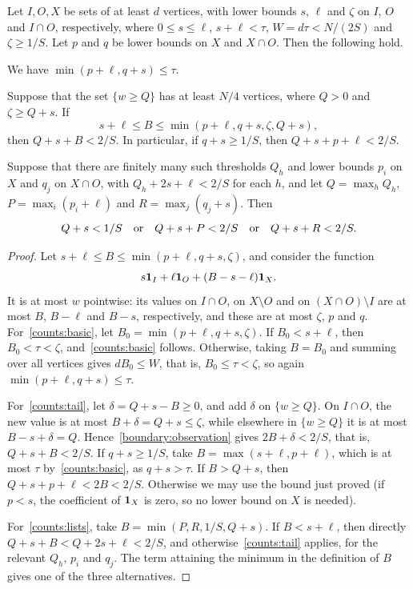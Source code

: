 \begin{lemma}
\label{boundary391:counts}\label{boundary391:counts:1}
\label{shiftroot:three-set}\label{jointtail:count}
\label{middlelift:capped-count}\label{pairedtails:disjunction}
Let $I,O,X$ be sets of at least $d$ vertices, with lower bounds
$s$, $\ell$ and $\zeta$ on $I$, $O$ and $I\cap O$, respectively, where
$0\le s\le\ell$, $s+\ell<\tau$,
$W=d\tau<N/(2S)$ and $\zeta\ge1/S$. Let $p$ and $q$ be lower bounds on $X$ and $X\cap O$. Then the following hold.
\begin{props}
\item\label{counts:basic} We have $\min(p+\ell,q+s)\le\tau$.
\item\label{counts:tail} Suppose that the set $\{w\ge Q\}$ has at least $N/4$ vertices, where $Q>0$ and $\zeta\ge Q+s$. If
\[
 s+\ell\le B\le\min(p+\ell,q+s,\zeta,Q+s),
\]
then $Q+s+B<2/S$. In particular, if $q+s\ge1/S$, then
$Q+s+p+\ell<2/S$.
\item\label{counts:lists} Suppose that there are finitely many such thresholds $Q_h$
and lower bounds $p_i$ on $X$ and $q_j$ on $X\cap O$, with $Q_h+2s+\ell<2/S$ for each $h$, and let
$Q=\max_h Q_h$, $P=\max_i(p_i+\ell)$ and $R=\max_j(q_j+s)$.
Then
\begin{equation}\label{pairedtails:three-branches}
 Q+s<1/S\quad\hbox{or}\quad Q+s+P<2/S
 \quad\hbox{or}\quad Q+s+R<2/S.
\end{equation}
\end{props}
\end{lemma}
\begin{proof}
Let $s+\ell\le B\le\min(p+\ell,q+s,\zeta)$, and consider the function
\[
 s\mathbf 1_I+\ell\mathbf 1_O+(B-s-\ell)\mathbf 1_X.
\]
It is at most $w$ pointwise: its values on
$I\cap O$, on $X\setminus O$ and on
$(X\cap O)\setminus I$ are at most $B$, $B-\ell$ and $B-s$, respectively, and these are at most $\zeta$, $p$ and $q$.
For~\ref{counts:basic}, let $B_0=\min(p+\ell,q+s,\zeta)$. If $B_0<s+\ell$, then
$B_0<\tau<\zeta$, and~\ref{counts:basic} follows. Otherwise, taking $B=B_0$ and summing over all vertices gives
$dB_0\le W$, that is, $B_0\le\tau<\zeta$, so again $\min(p+\ell,q+s)\le\tau$.

For~\ref{counts:tail}, let $\delta=Q+s-B\ge0$, and add $\delta$ on $\{w\ge Q\}$.
On $I\cap O$, the new value is at most
$B+\delta=Q+s\le\zeta$, while elsewhere in $\{w\ge Q\}$ it is at most
$B-s+\delta=Q$. Hence~\eqref{boundary:observation} gives $2B+\delta<2/S$, that is, $Q+s+B<2/S$.
If $q+s\ge1/S$, take $B=\max(s+\ell,p+\ell)$, which is at most $\tau$ by~\ref{counts:basic}, as $q+s>\tau$.
If $B>Q+s$, then $Q+s+p+\ell<2B<2/S$. Otherwise we may use the bound just proved
(if $p<s$, the coefficient of $\mathbf 1_X$ is zero, so no lower bound on $X$ is
needed).

For~\ref{counts:lists}, take
$B=\min(P,R,1/S,Q+s)$.
If $B<s+\ell$, then directly $Q+s+B<Q+2s+\ell<2/S$, and otherwise~\ref{counts:tail} applies, for the relevant $Q_h$, $p_i$ and $q_j$. The term attaining the
minimum in the definition of $B$ gives one of the three alternatives.
\end{proof}

